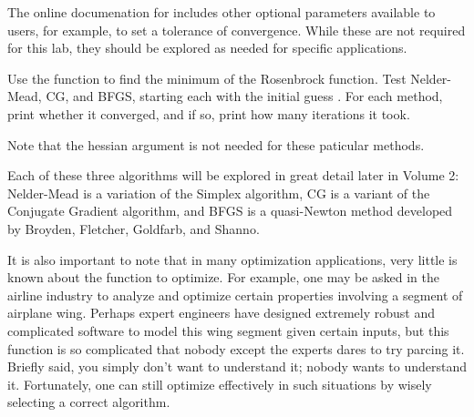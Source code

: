 The online documenation for  includes other optional parameters available to users, for example, to set a tolerance of convergence. 
While these are not required for this lab, they should be explored as needed for specific applications.

\begin{problem}
Use the  function to find the minimum of the Rosenbrock function.
Test Nelder-Mead, CG, and BFGS, starting each with the initial guess .
For each method, print whether it converged, and if so, print how many iterations it took.

Note that the hessian argument is not needed for these paticular methods. 
\end{problem}

Each of these three algorithms will be explored in great detail later in Volume 2: Nelder-Mead is a variation of the Simplex algorithm, CG is a variant of the Conjugate Gradient algorithm, and BFGS is a quasi-Newton method developed by Broyden, Fletcher, Goldfarb, and Shanno.

It is also important to note that in many optimization applications, very little is known about the function to optimize. 
For example, one may be asked in the airline industry to analyze and optimize certain properties involving a segment of airplane wing. 
Perhaps expert engineers have designed extremely robust and complicated software to model this wing segment given certain inputs, but this function is so complicated that nobody except the experts dares to try parcing it.
Briefly said, you simply don't want to understand it; nobody wants to understand it. 
Fortunately, one can still optimize effectively in such situations by wisely selecting a correct algorithm.

